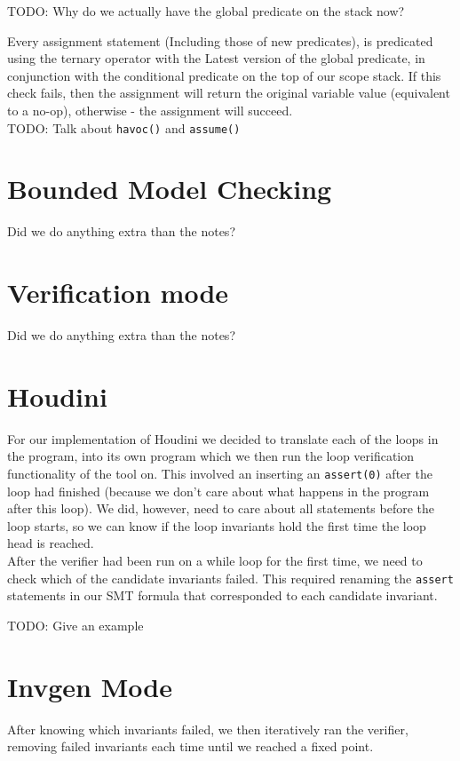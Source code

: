 \documentclass[11pt]{article}
\begin{document}
TODO: Why do we actually have the global predicate on the stack now?

Every assignment statement (Including those of new predicates), is predicated using the ternary operator
with the Latest version of the global predicate, in conjunction with the conditional predicate on the
top of our scope stack. If this check fails, then the assignment will return the original variable value
(equivalent to a no-op), otherwise - the assignment will succeed. \\

TODO: Talk about \verb|havoc()| and \verb|assume()|

\section{Bounded Model Checking}
Did we do anything extra than the notes?
\section{Verification mode}
Did we do anything extra than the notes?
\section{Houdini}

For our implementation of Houdini we decided to translate each of the loops in the program, into its own
program which we then run the loop verification functionality of the tool on. This involved an inserting an
\verb|assert(0)| after the loop had finished (because we don't care about what happens in the program after
this loop). We did, however, need to care about all statements before the loop starts, so we can know if the
loop invariants hold the first time the loop head is reached.\\

After the verifier had been run on a while loop for the first time, we need to check which of the candidate
invariants failed. This required renaming the \verb|assert| statements in our SMT formula that corresponded
to each candidate invariant.

TODO: Give an example \\

\section{Invgen Mode}
After knowing which invariants failed, we then iteratively ran the verifier, removing failed invariants each time
until we reached a fixed point.
\end{document}
